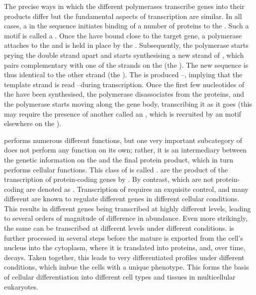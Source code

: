 The precise ways in which the different polymerases transcribe genes into their
\rna products differ but the fundamental aspects of transcription are similar.
In all cases, a  in the
\dna sequence initiates binding of a number of \tf proteins to the \dna. Such a
motif is called a . Once the \tf[s] have bound close to the
target gene, a polymerase attaches to the \dna and is held in place by the
\tf[s]. Subsequently, the polymerase starts prying the double strand apart and
starts synthesising a new strand of \rna, which pairs complementary with one of
the strands on the \dna (the ). The new \rna[’s]
sequence is thus identical to the other \dna strand (the ). The \rna is produced \fivep--\threep, implying that the template
strand is read \threep--\fivep during transcription. Once the first few
nucleotides of the \rna have been synthesised, the polymerase disassociates from
the \tf proteins, and the polymerase starts moving along the gene body,
transcribing it as it goes (this may require the presence of another \tf called
an , which is recruited by an  motif
elsewhere on the \dna).

\rna performs numerous different functions, but one very important subcategory
of \rna does not perform any function on its own; rather, it is an intermediary
between the genetic information on the \dna and the final protein product, which
in turn performs cellular functions. This class of \rna is called \mrna.
\mrna[s] are the product of the transcription of protein-coding genes by .
By contrast, \rna[s] which are not protein-coding are denoted as \ncrna.
Transcription of \mrna requires an exquisite control, and many different \tf[s]
are known to regulate different genes in different cellular conditions. This
results in different \mrna genes being transcribed at highly different levels,
leading to several orders of magnitude of difference in \mrna abundance. Even
more strikingly, the same \mrna can be transcribed at different levels under
different conditions. \mrna is further processed in several steps before the
mature \mrna is exported from the cell’s nucleus into the cytoplasm, where it is
translated into proteins, and, over time, decays. Taken together, this leads to
very differentiated \mrna profiles under different conditions, which imbue the
cells with a unique phenotype. This forms the basis of cellular differentiation
into different cell types and tissues in multicellular eukaryotes.

